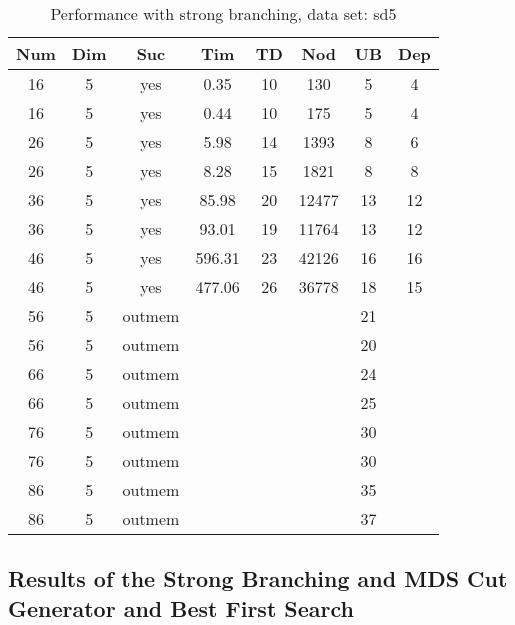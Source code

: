 \begin{table}[!htb]
  \centering
  \begin{tabular}[center]{|c|c|c|c|c|c|c|c|}
    \hline
    Num & Dim & Suc & Tim & TD & Nod & UB & Dep \\
    \hline
    16 & 5 & yes & 0.35 & 10 & 130 & 5 & 4 \\
    16 & 5 & yes & 0.44 & 10 & 175 & 5 & 4 \\
    26 & 5 & yes & 5.98 & 14 & 1393 & 8 & 6 \\
    26 & 5 & yes & 8.28 & 15 & 1821 & 8 & 8 \\
    36 & 5 & yes & 85.98 & 20 & 12477 & 13 & 12 \\
    36 & 5 & yes & 93.01 & 19 & 11764 & 13 & 12 \\
    46 & 5 & yes & 596.31 & 23 & 42126 & 16 & 16 \\
    46 & 5 & yes & 477.06 & 26 & 36778 & 18 & 15 \\
    56 & 5 & outmem &&&& 21 &\\
    56 & 5 & outmem &&&& 20 &\\
    66 & 5 & outmem &&&& 24 &\\
    66 & 5 & outmem &&&& 25 &\\
    76 & 5 & outmem &&&& 30 &\\
    76 & 5 & outmem &&&& 30 &\\
    86 & 5 & outmem &&&& 35 &\\
    86 & 5 & outmem &&&& 37 &\\
    \hline
  \end{tabular}
  \caption{Performance with strong branching, data set: sd5}
  \label{tab:test.bran-sd5}
\end{table}


\clearpage
\subsection{Results of the Strong Branching and MDS Cut Generator and Best First Search}
\label{sec:apd.bac.cutmds}

